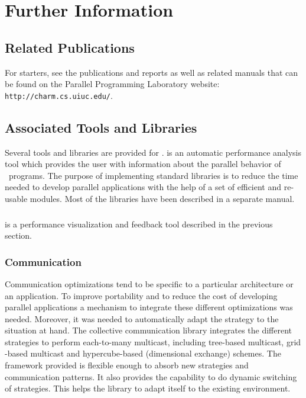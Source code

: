 \section{Further Information}

\subsection{Related Publications}
\label{publications}

For starters, see the publications and reports as well
as related manuals that can be found on the Parallel Programming
Laboratory website: \texttt{http://charm.cs.uiuc.edu/}. 

\subsection{Associated Tools and Libraries}

Several tools and libraries are provided for \charmpp{}. \projections{} 
is an automatic performance analysis tool which provides
the user with information about the parallel behavior of \charmpp\ programs. 
The purpose of implementing \charmpp{} standard
libraries is to reduce the time needed to develop parallel
applications with the help of a set of efficient and re-usable modules.
Most of the libraries have been described in a separate manual.

\subsubsection{\projections}

\projections{} is a performance visualization and feedback tool described 
in the previous section.

\subsubsection{Communication}

Communication optimizations tend to be specific to a particular architecture or
an application. To improve portability and to reduce the cost of developing
parallel applications a mechanism to integrate these different optimizations
was needed. Moreover, it was needed to automatically adapt the strategy to the
situation at hand. The collective communication library integrates the
different strategies to perform each-to-many multicast, including tree-based
multicast, grid -based multicast and hypercube-based (dimensional exchange)
schemes. The framework provided is flexible enough to absorb new strategies and
communication patterns. It also provides the capability to do dynamic switching
of strategies. This helps the library to adapt itself to the existing
environment.

